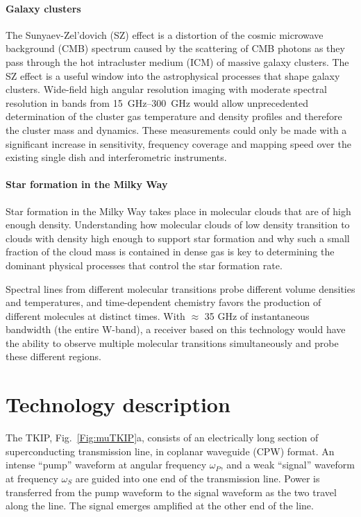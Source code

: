\paragraph*{Galaxy clusters}
The Sunyaev-Zel’dovich (SZ) effect is a distortion of the cosmic microwave background (CMB) spectrum caused by the scattering of CMB photons as they pass through the hot intracluster medium (ICM) of massive galaxy clusters. The SZ effect is a useful window into the astrophysical processes that shape galaxy clusters.  Wide-field high angular resolution imaging with moderate spectral resolution in bands from \SIrange{15}{300}{GHz} would allow unprecedented determination of the cluster gas temperature and density profiles and therefore the cluster mass and dynamics. These measurements could only be made with a significant increase in sensitivity, frequency coverage and mapping speed over the existing single dish and interferometric instruments.

\paragraph*{Star formation in the Milky Way}
Star formation in the Milky Way takes place in molecular clouds that are of high enough density. Understanding how molecular clouds of low density transition to clouds with density high enough to support star formation and why such a small fraction of the cloud mass is contained in dense gas is key to determining the dominant physical processes that control the star formation rate. 

Spectral lines from different molecular transitions probe different volume densities and temperatures, and time-dependent chemistry favors the production of different molecules at distinct times. With $\approx$ 35 GHz of instantaneous bandwidth (the entire W-band), a receiver based on this technology would have the ability to observe multiple molecular transitions simultaneously and probe these different regions.  




\section{Technology description}
The TKIP, Fig.~\ref{Fig:muTKIP}a,  consists of an electrically long section of superconducting transmission line,  in coplanar waveguide (CPW) format. An intense ``pump'' waveform at angular frequency $\omega_P$, and a weak ``signal'' waveform at frequency $\omega_S$ are guided into one end of the transmission line. Power is transferred from the pump waveform to the signal waveform as the two travel along the line. The signal emerges amplified at the other end of the line.  

